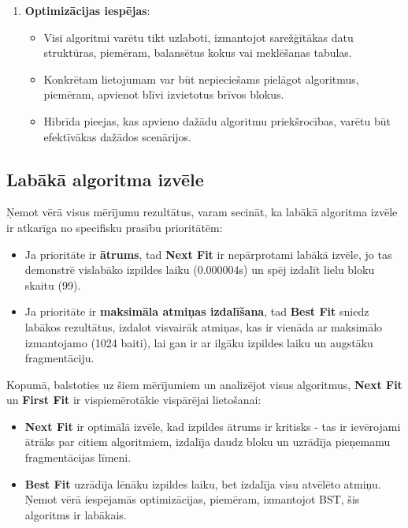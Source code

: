 \documentclass{report}
\begin{document}
\begin{enumerate}
		\item \textbf{Optimizācijas iespējas}:
		\begin{itemize}
			\item Visi algoritmi varētu tikt uzlaboti, izmantojot sarežģītākas datu struktūras, piemēram, balansētus kokus vai meklēšanas tabulas.
			\item Konkrētam lietojumam var būt nepieciešams pielāgot algoritmus, piemēram, apvienot blīvi izvietotus brīvos blokus.
			\item Hibrīda pieejas, kas apvieno dažādu algoritmu priekšrocības, varētu būt efektīvākas dažādos scenārijos.
		\end{itemize}
		
	\end{enumerate}
	
	\subsection{Labākā algoritma izvēle}
	
	Ņemot vērā visus mērījumu rezultātus, varam secināt, ka labākā algoritma izvēle ir atkarīga no specifisku prasību prioritātēm:
	
	\begin{itemize}
		\item Ja prioritāte ir \textbf{ātrums}, tad \textbf{Next Fit} ir nepārprotami labākā izvēle, jo tas demonstrē vislabāko izpildes laiku (0.000004s) un spēj izdalīt lielu bloku skaitu (99).
		
		\item Ja prioritāte ir \textbf{maksimāla atmiņas izdalīšana}, tad \textbf{Best Fit} sniedz labākos rezultātus, izdalot visvairāk atmiņas, kas ir vienāda ar maksimālo izmantojamo (1024 baiti), lai gan ir ar ilgāku izpildes laiku un augstāku fragmentāciju.
	\end{itemize}
		
		Kopumā, balstoties uz šiem mērījumiem un analizējot visus algoritmus, \textbf{Next Fit} un \textbf{First Fit} ir vispiemērotākie vispārējai lietošanai:
		
	\begin{itemize}
		\item \textbf{Next Fit} ir optimālā izvēle, kad izpildes ātrums ir kritisks - tas ir ievērojami ātrāks par citiem algoritmiem, izdalīja daudz bloku un uzrādīja pieņemamu fragmentācijas līmeni.
		
		\item \textbf{Best Fit} uzrādīja lēnāku izpildes laiku, bet izdalīja visu atvēlēto atmiņu. Ņemot vērā iespējamās optimizācijas, piemēram, izmantojot BST, šis algoritms ir labākais. 
	\end{itemize}
\end{document}

